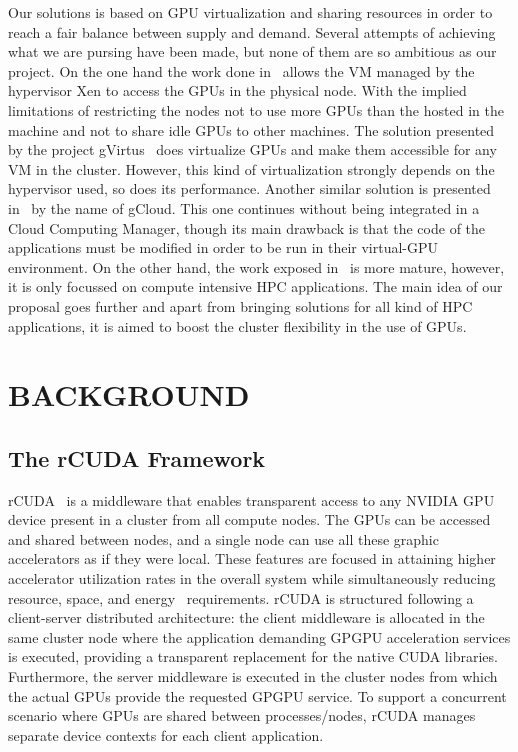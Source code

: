 \documentclass[a4paper,twoside]{article}
\begin{document}
\noindent 
Our solutions
is based on GPU virtualization and sharing resources in order
to reach a fair balance between supply and demand.
Several attempts of achieving what we are pursing have been
made, but none of them are so ambitious as our project. On
the one hand the work done in~\cite{younge2013enabling} allows the VM managed
by the hypervisor Xen to access the GPUs in the physical
node. With the implied limitations of restricting the nodes not
to use more GPUs than the hosted in the machine and not
to share idle GPUs to other machines. The solution presented
by the project gVirtus~\cite{giunta2010gpgpu} does virtualize GPUs and make
them accessible for any VM in the cluster. However, this kind
of virtualization strongly depends on the hypervisor used, so
does its performance. Another similar solution is presented in~\cite{diab2013dynamic} by the name of gCloud. This one continues without being
integrated in a Cloud Computing Manager, though its main
drawback is that the code of the applications must be modified
in order to be run in their virtual-GPU environment. On the
other hand, the work exposed in~\cite{jungpgpu} is more mature, however,
it is only focussed on compute intensive HPC applications.
The main idea of our proposal goes further and apart from
bringing solutions for all kind of HPC applications, it is aimed
to boost the cluster flexibility in the use of GPUs.


\section{\uppercase{Background}}
\label{sec:background}
\subsection{The rCUDA Framework}
\label{sec:rcuda}

{rCUDA}~\cite{tonithesis,toniparco} is a middleware that enables transparent access
to any NVIDIA GPU device present in a cluster from all compute
nodes. The GPUs can be accessed and shared between nodes, and a single node can use all these graphic accelerators
as if they were local.
These features are focused in attaining higher accelerator utilization rates in the overall system while simultaneously reducing
resource, space, and energy~\cite{energy14} requirements.
rCUDA is structured following a client-server distributed
architecture: the client middleware is allocated in the same cluster node where the application demanding GPGPU
acceleration services is executed, providing a transparent replacement for the
native CUDA libraries. Furthermore, the server middleware is executed in the
cluster nodes from which the actual GPUs provide the requested GPGPU service.
To support a concurrent scenario where GPUs are shared between
processes\slash nodes, {rCUDA} manages separate device contexts for
each client application.
\end{document}

